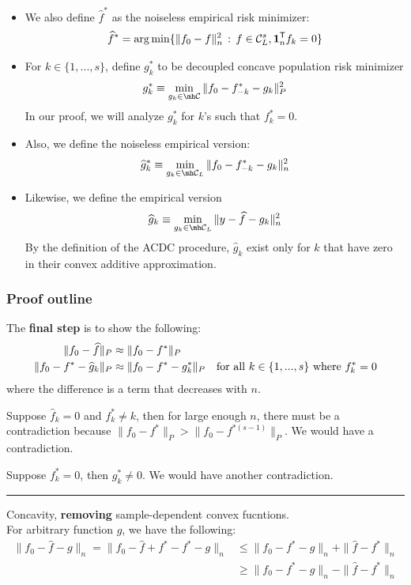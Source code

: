 \documentclass{article}
\begin{document}
{\begin{itemize}
\item We also define $\hat{f}^*$ as the noiseless empirical risk minimizer:
\[
\widehat{f}^* = \arg\min \{ \| f_0 - f \|_n^2 \,:\, 
f \in \mathcal{C}^s_L, \mathbf{1}_n^{\mathsf{T}} f_k = 0\}
\]

\item For $k \in \{1,...,s\}$, define $g^*_k$ to be decoupled concave population risk minimizer
\[
g^*_k \equiv \min_{g_k \in \mh \mathcal{C}} \| f_0 - f^*_{-k} - g_k \|_P^2
\]
In our proof, we will analyze $g^*_k$ for $k$'s such that $f^*_k = 0$. 

\item Also, we define the noiseless empirical version:
\[
\hat{g}^*_k \equiv \min_{g_k \in \mh \mathcal{C}_L} \| f_0 - f^*_{-k} - g_k \|_n^2
\]

\item Likewise, we define the empirical version
\[
\hat{g}_k \equiv \min_{g_k \in \mh \mathcal{C}_L} \| y - \hat{f} - g_k \|_n^2
\]
By the definition of the ACDC procedure, $\hat{g}_k$ exist only for $k$ that have zero in their convex additive approximation.

\end{itemize}

\newpage
\subsubsection{Proof outline}


The \textbf{final step} is to show the following:
\begin{align*}
\| f_0 - \widehat{f} \|_P & \approx \| f_0 - f^* \|_P \\
\| f_0 - f^* - \widehat{g}_k \|_P & \approx \| f_0 - f^* - g^*_k \|_P \quad \textrm{for all $k \in \{1,...,s\}$ where $f^*_k = 0$}
\end{align*}
where the difference is a term that decreases with $n$.

Suppose $\hat{f}_k = 0$ and $f^*_k \neq k$, then for large enough $n$, there must be a contradiction because $\| f_0 - f^* \|_P > \| f_0 - f^{*(s-1)} \|_P$. We would have a contradiction.

Suppose $f^*_k = 0$, then $g^*_k \neq 0$. We would have another contradiction.

\rule{5cm}{0.4pt}
\vspace{0.2in}

Concavity, \textbf{removing} sample-dependent convex fucntions.\\

For arbitrary function $g$, we have the following:
\begin{align*}
\| f_0 - \hat{f} - g \|_n = \| f_0 - \hat{f} + f^* - f^* - g \|_n 
   & \leq \| f_0 - f^* -g \|_n
       + \| \hat{f} - f^* \|_n \\
   &\geq \| f_0 - f^* - g \|_n - \| \hat{f} - f^* \|_n 
\end{align*}

}
\end{document}
